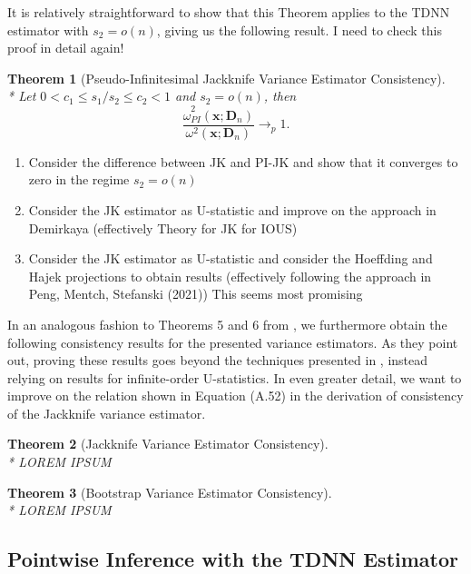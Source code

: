 \documentclass[letterpaper,10pt]{article}
\numberwithin{equation}{section}
\newtheorem{thm}{Theorem}
\numberwithin{thm}{section}
\numberwithin{lem}{section}
\numberwithin{cor}{section}
\renewcommand{\hat}{\widehat}
\newcommand{\1}{\mathbbm{1}}
\begin{document}
It is relatively straightforward to show that this Theorem applies to the TDNN estimator with $s_2 = o(n)$, giving us the following result.
	{\color{red} I need to check this proof in detail again!}
\begin{thm}[Pseudo-Infinitesimal Jackknife Variance Estimator Consistency]\label{thm:PI_JK_Cons}\mbox{}\\*
	Let $0 < c_1 \leq s_1/s_2 \leq c_2 < 1$ and $s_2 = o(n)$, then
	\begin{equation}
		\frac{\hat{\omega}_{PI}^2\left(\mathbf{x}; \mathbf{D}_n\right)}{\omega^{2}\left(\mathbf{x}; \mathbf{D}_n\right)} \longrightarrow_{p} 1.
	\end{equation}
\end{thm}

{\color{red}
\begin{enumerate}
	\item Consider the difference between JK and PI-JK and show that it converges to zero in the regime $s_2 = o(n)$
	\item Consider the JK estimator as U-statistic and improve on the approach in Demirkaya
	      (effectively Theory for JK for IOUS)
	\item Consider the JK estimator as U-statistic and consider the Hoeffding and Hajek projections to obtain results
	      (effectively following the approach in Peng, Mentch, Stefanski (2021))
	      This seems most promising
\end{enumerate}

In an analogous fashion to Theorems 5 and 6 from \citet{demirkaya_optimal_2024}, we furthermore obtain the following consistency results for the presented variance estimators.
As they point out, proving these results goes beyond the techniques presented in \citet{arvesen_jackknifing_1969}, instead relying on results for infinite-order U-statistics.
In even greater detail, we want to improve on the relation shown in Equation (A.52) in the derivation of consistency of the Jackknife variance estimator.
\begin{thm}[Jackknife Variance Estimator Consistency]\label{thm:JK_Cons}\mbox{}\\*
	LOREM IPSUM
\end{thm}

\begin{thm}[Bootstrap Variance Estimator Consistency]\label{thm:BS_Cons}\mbox{}\\*
	LOREM IPSUM
\end{thm}
}

\subsection{Pointwise Inference with the TDNN Estimator}
\end{document}
